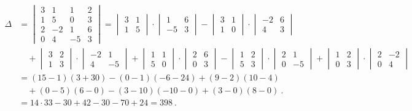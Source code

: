 \documentclass[11pt]{article}
\let\Delta\varDelta
\begin{document}
\[
\begin{aligned}
\Delta &= \begin{vmatrix} 3 & 1 & 1 & 2 \\ 1 & 5 & 0 & 3 \\ 2 & -2 & 1 & 6 \\ 0 & 4 & -5 & 3 \end{vmatrix}
= \begin{vmatrix} 3 & 1 \\ 1 & 5 \end{vmatrix} \cdot \begin{vmatrix} 1 & 6 \\ -5 & 3 \end{vmatrix}
- \begin{vmatrix} 3 & 1 \\ 1 & 0 \end{vmatrix} \cdot \begin{vmatrix} -2 & 6 \\ 4 & 3 \end{vmatrix}\\
&\quad + \begin{vmatrix} 3 & 2 \\ 1 & 3 \end{vmatrix} \cdot \begin{vmatrix} -2 & 1 \\ 4 & -5 \end{vmatrix}
+ \begin{vmatrix} 1 & 1 \\ 5 & 0 \end{vmatrix} \cdot \begin{vmatrix} 2 & 6 \\ 0 & 3 \end{vmatrix}
- \begin{vmatrix} 1 & 2 \\ 5 & 3 \end{vmatrix} \cdot \begin{vmatrix} 2 & 1 \\ 0 & -5 \end{vmatrix}
+ \begin{vmatrix} 1 & 2 \\ 0 & 3 \end{vmatrix} \cdot \begin{vmatrix} 2 & -2 \\ 0 & 4 \end{vmatrix}\\
&= (15-1)(3+30) - (0-1)(-6-24) + (9-2)(10-4)\\
&\quad + (0-5)(6-0) - (3-10)(-10-0) + (3-0)(8-0)\ .\\
&= 14\cdot 33 - 30 + 42 - 30 - 70 + 24 = 398\ .
\end{aligned}
\]
\end{document}
